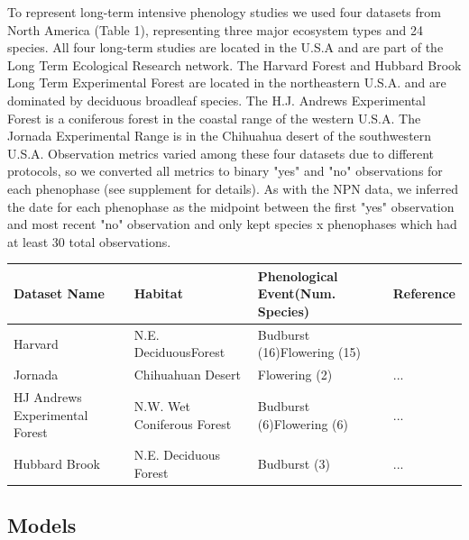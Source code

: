 \documentclass[fleqn,10pt,lineno]{wlpeerj} %
\begin{document}
To represent long-term intensive phenology studies we used four datasets from North America (Table 1), representing three major ecosystem types and 24 species. All four long-term studies are located in the U.S.A and are part of the Long Term Ecological Research network. The Harvard Forest and Hubbard Brook Long Term Experimental Forest are located in the northeastern U.S.A. and are dominated by deciduous broadleaf species. The H.J. Andrews Experimental Forest is a coniferous forest in the coastal range of the western U.S.A. The Jornada Experimental Range is in the Chihuahua desert of the southwestern U.S.A. Observation metrics varied among these four datasets due to different protocols, so we converted all metrics to binary "yes" and "no" observations for each phenophase (see supplement for details). As with the NPN data, we inferred the date for each phenophase as the midpoint between the first "yes" observation and most recent "no" observation and only kept species x phenophases which had at least 30 total observations. 

\renewcommand{\arraystretch}{2}\tabcolsep=5pt
\begin{center}
    \begin{tabular}{ | l | l | l | l |}
    \hline
    Dataset Name & Habitat &  Phenological Event\newline (Num. Species) & Reference \\ \hline
    Harvard & N.E. Deciduous\newline Forest & Budburst (16)\newline Flowering (15) & \citep{okeefe2000} \\
    Jornada & Chihuahuan Desert & Flowering (2) & ... \\
    HJ Andrews \newline Experimental Forest & N.W. Wet Coniferous \newline Forest & Budburst (6)\newline Flowering (6) & ... \\
    Hubbard Brook & N.E. Deciduous \newline Forest & Budburst (3) & ... \\
    \hline
    \end{tabular}
\end{center}

\subsection*{Models}
\end{document}
